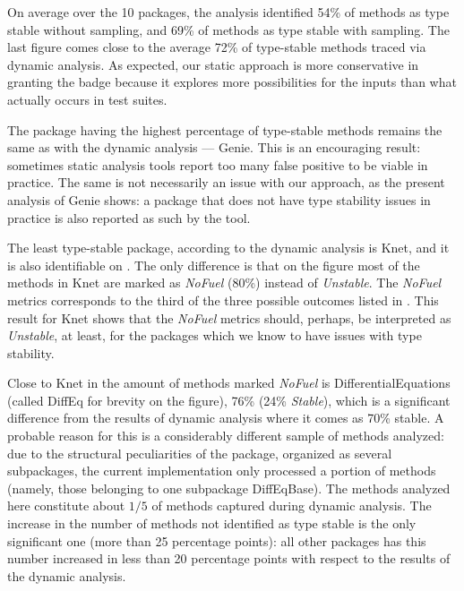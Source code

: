 On average over the 10 packages, the analysis identified 54\% of methods as type
stable without sampling, and 69\% of methods as type stable with sampling. The
last figure comes close to the average 72\% of type-stable methods traced via
dynamic analysis. As expected, our static approach is more conservative in granting the
badge because it explores more possibilities for the inputs than what actually
occurs in test suites.

The package having the highest percentage of type-stable methods remains the same as
with the dynamic analysis --- Genie. This is an encouraging result: sometimes static
analysis tools report too many false positive to be viable in practice.
The same is not necessarily an issue with our approach, as
the present analysis of Genie shows: a package that does not have type stability
issues in practice is also reported as such by the tool.

The least type-stable package, according to the dynamic analysis is Knet, and it
is also identifiable on . The only difference is that
on the figure most of the methods in Knet are marked as \emph{NoFuel} (80\%)
instead of \emph{Unstable}. The \emph{NoFuel} metrics corresponds to the third
of the three possible outcomes listed in . This
result for Knet shows that the \emph{NoFuel} metrics should, perhaps, be
interpreted as \emph{Unstable}, at least, for the packages which we know to have issues
with type stability.

Close to Knet in the amount of methods marked \emph{NoFuel} is
DifferentialEquations (called DiffEq for brevity on the figure), 76\% (24\%
\emph{Stable}), which is a significant difference from the results of dynamic
analysis where it comes as 70\% stable. A probable reason for this is a
considerably different sample of methods analyzed: due to the structural
peculiarities of the package, organized as several subpackages, the current
implementation only processed a portion of methods (namely, those belonging to
one subpackage DiffEqBase). The methods analyzed here constitute about $1/5$ of
methods captured during dynamic analysis. The increase in the number of methods
not identified as type stable is the only significant one (more than 25
percentage points): all other packages has this number increased in less
than 20 percentage points with respect to the results of the dynamic analysis.

